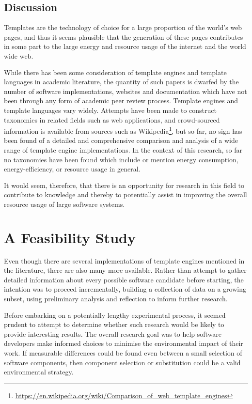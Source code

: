 \subsection{Discussion}

Templates are the technology of choice for a large proportion of the world's web pages, and thus it seems plausible that the generation of these pages contributes in some part to the large energy and resource usage of the internet and the world wide web.

While there has been some consideration of template engines and template languages in academic literature, the quantity of such papers is dwarfed by the number of software implementations, websites and documentation which have not been through any form of academic peer review process. Template engines and template languages vary widely. Attempts have been made to construct taxonomies in related fields such as web applications, and crowd-sourced information is available from sources such as Wikipedia\footnote{\url{https://en.wikipedia.org/wiki/Comparison_of_web_template_engines}}, but so far, no sign has been found of a detailed and comprehensive comparison and analysis of a wide range of template engine implementations. In the context of this research, so far no taxonomies have been found which include or mention energy consumption, energy-efficiency, or resource usage in general.

It would seem, therefore, that there is an opportunity for research in this field to contribute to knowledge and thereby to potentially assist in improving the overall resource usage of large software systems.

\section{A Feasibility Study}
\label{fs:methodology}
\label{section:fs1}

Even though there are several implementations of template engines mentioned in the literature, there are also many more available. Rather than attempt to gather detailed information about every possible software candidate before starting, the intention was to proceed incrementally, building a collection of data on a growing subset, using preliminary analysis and reflection to inform further research.

Before embarking on a potentially lengthy experimental process, it seemed prudent to attempt to determine whether such research would be likely to provide interesting results. The overall research goal was to help software developers make informed choices to minimise the environmental impact of their work. If measurable differences could be found even between a small selection of software components, then component selection or substitution could be a valid environmental strategy.

